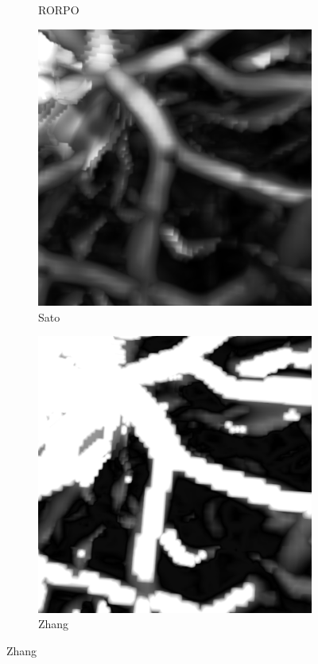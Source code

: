 \begin{figure}[!ht]
\begin{subfigure}[t]{0.30\textwidth}
        \caption{RORPO}
      \end{subfigure}
      \begin{subfigure}[t]{0.30\textwidth}
        \includegraphics[clip = true, trim  = 0 50 0 80, width=\textwidth]{Images/Ircad_k_Sato.png}
        \caption{Sato}
      \end{subfigure}
      \begin{subfigure}[t]{0.30\textwidth}
        \includegraphics[clip = true, trim  = 0 50 0 80, width=\textwidth]{Images/Ircad_k_Zhang.png}
        \caption{Zhang}
      \end{subfigure}


\end{figure}
